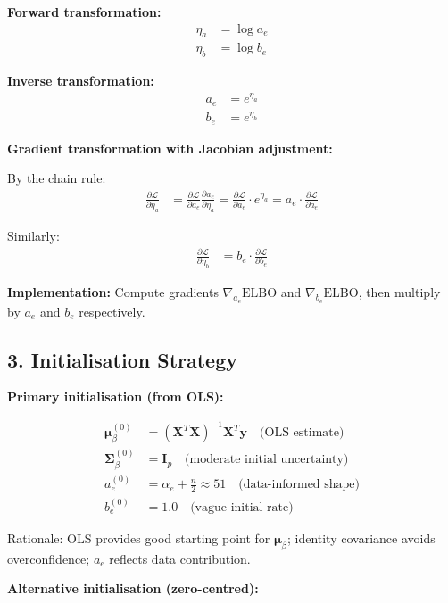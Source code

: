 \documentclass[11pt,a4paper]{article}
\newcommand{\ELBO}{\text{ELBO}}
\begin{document}
\textbf{Forward transformation:}
\begin{align}
\eta_a &= \log a_e\\
\eta_b &= \log b_e
\end{align}

\textbf{Inverse transformation:}
\begin{align}
a_e &= e^{\eta_a}\\
b_e &= e^{\eta_b}
\end{align}

\textbf{Gradient transformation with Jacobian adjustment:}

By the chain rule:
\begin{align}
\frac{\partial \mathcal{L}}{\partial \eta_a} &= \frac{\partial \mathcal{L}}{\partial a_e} \frac{\partial a_e}{\partial \eta_a} = \frac{\partial \mathcal{L}}{\partial a_e} \cdot e^{\eta_a} = a_e \cdot \frac{\partial \mathcal{L}}{\partial a_e}
\end{align}

Similarly:
\begin{align}
\frac{\partial \mathcal{L}}{\partial \eta_b} &= b_e \cdot \frac{\partial \mathcal{L}}{\partial b_e}
\end{align}

\textbf{Implementation:} Compute gradients $\nabla_{a_e} \ELBO$ and $\nabla_{b_e} \ELBO$, then multiply by $a_e$ and $b_e$ respectively.

\subsection*{3. Initialisation Strategy}

\textbf{Primary initialisation (from OLS):}

\begin{align}
\bm{\mu}_\beta^{(0)} &= (\bm{X}^T \bm{X})^{-1} \bm{X}^T \bm{y} \quad \text{(OLS estimate)}\\
\bm{\Sigma}_\beta^{(0)} &= \bm{I}_p \quad \text{(moderate initial uncertainty)}\\
a_e^{(0)} &= \alpha_e + \frac{n}{2} \approx 51 \quad \text{(data-informed shape)}\\
b_e^{(0)} &= 1.0 \quad \text{(vague initial rate)}
\end{align}

Rationale: OLS provides good starting point for $\bm{\mu}_\beta$; identity covariance avoids overconfidence; $a_e$ reflects data contribution.

\textbf{Alternative initialisation (zero-centred):}
\end{document}
